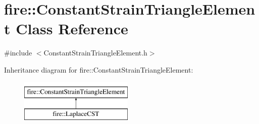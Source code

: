 \hypertarget{a00789}{}\section{fire\+:\+:Constant\+Strain\+Triangle\+Element Class Reference}
\label{a00789}


{\ttfamily \#include $<$Constant\+Strain\+Triangle\+Element.\+h$>$}

Inheritance diagram for fire\+:\+:Constant\+Strain\+Triangle\+Element\+:\begin{figure}[H]
\begin{center}
\leavevmode
\includegraphics[height=2.000000cm]{a00789}
\end{center}
\end{figure}

